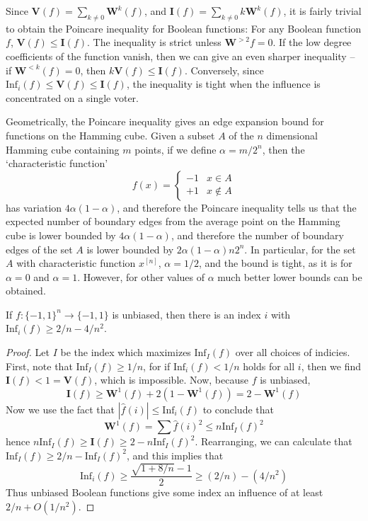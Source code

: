 Since $\mathbf{V}(f) = \sum_{k \neq 0} \mathbf{W}^k(f)$, and $\mathbf{I}(f) = \sum_{k \neq 0} k\mathbf{W}^k(f)$, it is fairly trivial to obtain the Poincare inequality for Boolean functions: For any Boolean function $f$, $\mathbf{V}(f) \leq \mathbf{I}(f)$. The inequality is strict unless $\mathbf{W}^{> 2} f = 0$. If the low degree coefficients of the function vanish, then we can give an even sharper inequality -- if $\mathbf{W}^{< k}(f) = 0$, then $k \mathbf{V}(f) \leq \mathbf{I}(f)$. Conversely, since $\text{Inf}_i(f) \leq \mathbf{V}(f) \leq \mathbf{I}(f)$, the inequality is tight when the influence is concentrated on a single voter.

\begin{example}
    Geometrically, the Poincare inequality gives an edge expansion bound for functions on the Hamming cube. Given a subset $A$ of the $n$ dimensional Hamming cube containing $m$ points, if we define $\alpha = m/2^n$, then the `characteristic function'
    \[ f(x) = \begin{cases} -1 & x \in A \\ +1 & x \not \in A \end{cases} \]
    has variation $4 \alpha (1 - \alpha)$, and therefore the Poincare inequality tells us that the expected number of boundary edges from the average point on the Hamming cube is lower bounded by $4 \alpha (1 - \alpha)$, and therefore the number of boundary edges of the set $A$ is lower bounded by $2 \alpha (1 - \alpha) n 2^n$. In particular, for the set $A$ with characteristic function $x^{[n]}$, $\alpha = 1/2$, and the bound is tight, as it is for $\alpha = 0$ and $\alpha = 1$. However, for other values of $\alpha$ much better lower bounds can be obtained.
\end{example}

\begin{lemma}
    If $f: \{ -1, 1 \}^n \to \{ -1, 1 \}$ is unbiased, then there is an index $i$ with $\text{Inf}_i(f) \geq 2/n - 4/n^2$.
\end{lemma}
\begin{proof}
    Let $I$ be the index which maximizes $\text{Inf}_I(f)$ over all choices of indicies. First, note that $\text{Inf}_I(f) \geq 1/n$, for if $\text{Inf}_i(f) < 1/n$ holds for all $i$, then we find $\mathbf{I}(f) < 1 = \mathbf{V}(f)$, which is impossible. Now, because $f$ is unbiased,
    \[ \mathbf{I}(f) \geq \mathbf{W}^1(f) + 2(1 - \mathbf{W}^1(f)) = 2 - \mathbf{W}^1(f) \]
    Now we use the fact that $|\widehat{f}(i)| \leq \text{Inf}_i(f)$ to conclude that
    \[ \mathbf{W}^1(f) = \sum \widehat{f}(i)^2 \leq n \text{Inf}_I(f)^2 \]
    hence $n \text{Inf}_I(f) \geq \mathbf{I}(f) \geq 2 - n \text{Inf}_I(f)^2$. Rearranging, we can calculate that $\text{Inf}_I(f) \geq 2/n - \text{Inf}_I(f)^2$, and this implies that
    \[ \text{Inf}_i(f) \geq \frac{\sqrt{1 + 8/n} - 1}{2} \geq (2/n) - (4/n^2) \]
    Thus unbiased Boolean functions give some index an influence of at least $2/n + O(1/n^2)$.
\end{proof}

